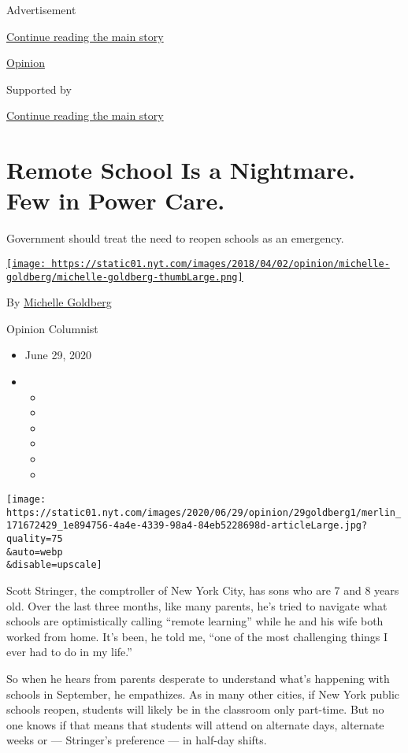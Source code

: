 Advertisement

\protect\hyperlink{after-top}{Continue reading the main story}

\href{/section/opinion}{Opinion}

Supported by

\protect\hyperlink{after-sponsor}{Continue reading the main story}

\hypertarget{remote-school-is-a-nightmare-few-in-power-care}{%
\section{Remote School Is a Nightmare. Few in Power
Care.}\label{remote-school-is-a-nightmare-few-in-power-care}}

Government should treat the need to reopen schools as an emergency.

\href{https://www.nytimes.com/by/michelle-goldberg}{\texttt{[image: https://static01.nyt.com/images/2018/04/02/opinion/michelle-goldberg/michelle-goldberg-thumbLarge.png]}}

By \href{https://www.nytimes.com/by/michelle-goldberg}{Michelle
Goldberg}

Opinion Columnist

\begin{itemize}
\item
  June 29, 2020
\item
  \begin{itemize}
  \item
  \item
  \item
  \item
  \item
  \item
  \end{itemize}
\end{itemize}

\texttt{[image: https://static01.nyt.com/images/2020/06/29/opinion/29goldberg1/merlin\_171672429\_1e894756-4a4e-4339-98a4-84eb5228698d-articleLarge.jpg?quality=75\\\&auto=webp\\\&disable=upscale]}

Scott Stringer, the comptroller of New York City, has sons who are 7 and
8 years old. Over the last three months, like many parents, he's tried
to navigate what schools are optimistically calling ``remote learning''
while he and his wife both worked from home. It's been, he told me,
``one of the most challenging things I ever had to do in my life.''

So when he hears from parents desperate to understand what's happening
with schools in September, he empathizes. As in many other cities, if
New York public schools reopen, students will likely be in the classroom
only part-time. But no one knows if that means that students will attend
on alternate days, alternate weeks or --- Stringer's preference --- in
half-day shifts.

